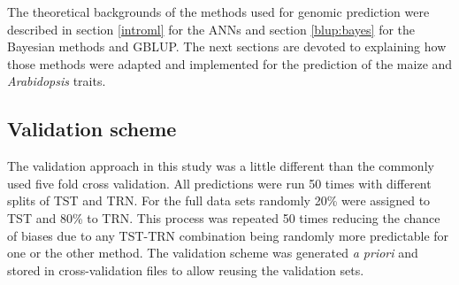 The theoretical backgrounds of the methods used for genomic prediction were described in
section \ref{introml} for the ANNs and section \ref{blup:bayes} for the Bayesian methods
and GBLUP. The next sections are devoted to explaining how those methods were adapted and
implemented for the prediction of the maize and \textit{Arabidopsis} traits.

\subsection{Validation scheme} \label{cv}

The validation approach in this study was a little different than the commonly used five
fold cross validation. All predictions were run 50 times with different splits of TST and
TRN. For the full data sets randomly 20\% were assigned to TST and 80\% to TRN. This
process was repeated 50 times reducing the chance of biases due to any TST-TRN combination
being randomly more predictable for one or the other method. The validation scheme was
generated \textit{a priori} and stored in cross-validation files to allow reusing the
validation sets.

